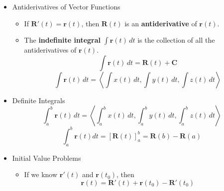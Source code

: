 \documentclass[12pt]{article}
\newcommand{\ds}{\displaystyle}
\renewcommand{\vec}[1]{\mathbf{#1}}
\newcommand{\dvar}[1]{\,d{#1}}
\newcommand{\<}{\left<}
\renewcommand{\>}{\right>}
\begin{document}
  \begin{itemize}
    \item Antiderivatives of Vector Functions
      \begin{itemize}
        \item If $\vec{R}'(t)=\vec{r}(t)$, then $\vec{R}(t)$ is an \textbf{antiderivative} of $\vec{r}(t)$.
        \item The \textbf{indefinite integral} $\ds \int \vec{r}(t) \dvar{t}$ is the collection of all the antiderivatives of $\vec{r}(t)$.
        \[\ds\int \vec{r}(t) \dvar{t} = \vec{R}(t) + \vec{C}\]
        \[\ds\int \vec{r}(t) \dvar{t} = \<\int x(t) \dvar{t}, \int y(t) \dvar{t}, \int z(t) \dvar{t} \> \]
      \end{itemize}

    \item Definite Integrals
      \[\ds\int^b_a \vec{r}(t) \dvar{t} = \<\int^b_a x(t) \dvar{t}, \int^b_a y(t) \dvar{t}, \int^b_a z(t) \dvar{t} \> \]
      \[\int^b_a \vec{r}(t)dt = \left[\vec{R}(t)\right]^b_a=\vec{R}(b)-\vec{R}(a)\]
      
    \item Initial Value Problems
      \begin{itemize}
      \item If we know $\vec{r}'(t)$ and $\vec{r}(t_0)$, then \[\vec{r}(t)=\vec{R}'(t)+\vec{r}(t_0)-\vec{R}'(t_0)\]
      \end{itemize}
    

\end{itemize}
\end{document}
